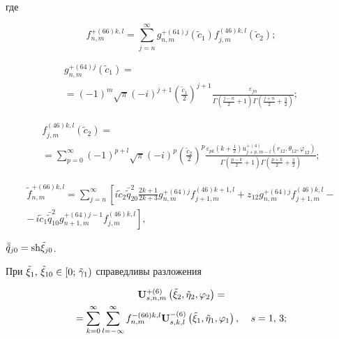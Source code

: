 \begin{russian}
\begin{theorem}
\noindent где

\begin{equation}\label{eq:1:80}
f_{n,m}^{ + (66)k,l} = \sum\limits_{j = n}^\infty  {g_{n,m}^{ + (64)j}} ({\tilde c_1})f_{j,m}^{(46)k,l}({\tilde c_2});
\end{equation}

\begin{multline}\label{eq:1:81}
g_{n,m}^{ + (64)j}({\tilde c_1}) = \\
= {( - 1)^m}\sqrt \pi  {( - i)^{j + 1}}{\left( {\frac{{{{\tilde c}_1}}}{2}} \right)^{j + 1}}\frac{{{\varepsilon _{jn}}}}{{\Gamma \left( {\frac{{j - n}}{2} + 1} \right)\Gamma \left( {\frac{{j + n}}{2} + \frac{3}{2}} \right)}};
\end{multline}

\begin{multline}\label{eq:1:82}
f_{j,m}^{(46)k,l}({\tilde c_2}) = \\
= \sum\limits_{p = 0}^\infty  {{{( - 1)}^{p + l}}} \sqrt \pi  {( - i)^p}{\left( {\frac{{{{\tilde c}_2}}}{2}} \right)^p}\frac{{{\varepsilon _{pk}}\left( {k + \frac{1}{2}} \right)u_{j + p,m - l}^{ + (4)}\left( {{r_{12}},{\theta _{12}},{\varphi _{12}}} \right)}}{{\Gamma \left( {\frac{{p - k}}{2} + 1} \right)\Gamma \left( {\frac{{p + k}}{2} + \frac{3}{2}} \right)}};
\end{multline}

\begin{multline}\label{eq:1:83}
\tilde f_{n,m}^{ + (66)k,l} = \sum\limits_{j = n}^\infty  {\left[ {i{{\tilde c}_2}\bar{\tilde q}_{20}^2\frac{{2k + 1}}{{2k + 3}}} \right.} g_{n,m}^{ + (64)j}f_{j + 1,m}^{(46)k + 1,l} + {z_{12}}g_{n,m}^{ + (64)j}f_{j + 1,m}^{(46)k,l} - \\
- \left. {\frac{{}}{{}}i{{\tilde c}_1}\bar{\tilde q}_{10}^2g_{n + 1,m}^{ + (64)j - 1}f_{j,m}^{(46)k,l}} \right],
\end{multline}

\noindent ${\bar{\tilde q}_{j0}} = {\mathop{\rm sh}\nolimits} {\tilde \xi _{j0}}$.

При ${\tilde \xi _1},{\mkern 1mu} {\kern 1pt} {\tilde \xi _{10}} \in \left[ {0;{\mkern 1mu} {\kern 1pt} {{\tilde \gamma }_1}} \right)$ справедливы разложения

\begin{multline}\label{eq:1:84}
{\bf{U}}_{s,n,m}^{ + (6)}\left( {{{\tilde \xi }_2},{{\tilde \eta }_2},{\varphi _2}} \right) = \\
= \sum\limits_{k = 0}^\infty  {\sum\limits_{l =  - \infty }^\infty  {f_{n,m}^{ - (66)k,l}} } {\bf{U}}_{s,k,l}^{ - (6)}\left( {{{\tilde \xi }_1},{{\tilde \eta }_1},{\varphi _1}} \right), \quad {\kern 1pt} s = 1,{\mkern 1mu} {\kern 1pt} 3;
\end{multline}


\end{theorem}
\end{russian}
